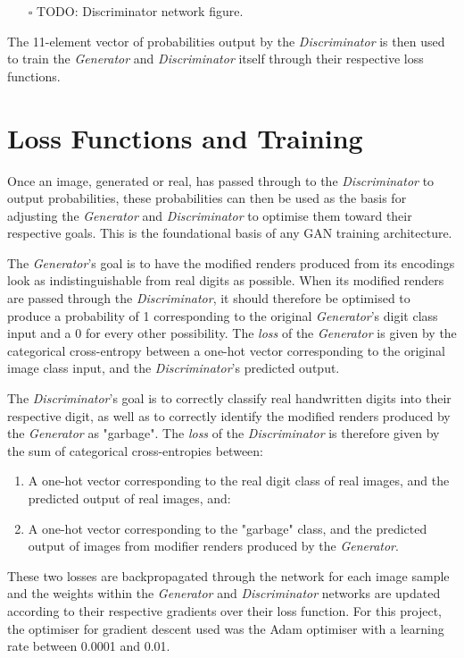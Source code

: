 \documentclass[a4paper,11pt,openany]{book}
\begin{document}
\begin{itemize}
\item[{$\square$}] TODO: Discriminator network figure.
\end{itemize}

The 11-element vector of probabilities output by the \emph{Discriminator} is then used to train the \emph{Generator} and \emph{Discriminator} itself through their respective loss functions.

\section*{Loss Functions and Training}
\label{sec:org99a8998}

Once an image, generated or real, has passed through to the \emph{Discriminator} to output probabilities, these probabilities can then be used as the basis for adjusting the \emph{Generator} and \emph{Discriminator} to optimise them toward their respective goals.
This is the foundational basis of any GAN training architecture.

The \emph{Generator}'s goal is to have the modified renders produced from its encodings look as indistinguishable from real digits as possible.
When its modified renders are passed through the \emph{Discriminator}, it should therefore be optimised to produce a probability of 1 corresponding to the original \emph{Generator}'s digit class input and a 0 for every other possibility.
The \emph{loss} of the \emph{Generator} is given by the categorical cross-entropy between a one-hot vector corresponding to the original image class input, and the \emph{Discriminator}'s predicted output.

The \emph{Discriminator}'s goal is to correctly classify real handwritten digits into their respective digit, as well as to correctly identify the modified renders produced by the \emph{Generator} as "garbage".
The \emph{loss} of the \emph{Discriminator} is therefore given by the sum of categorical cross-entropies between:
\begin{enumerate}
\item A one-hot vector corresponding to the real digit class of real images, and the predicted output of real images, and:
\item A one-hot vector corresponding to the "garbage" class, and the predicted output of images from modifier renders produced by the \emph{Generator}.
\end{enumerate}

These two losses are backpropagated through the network for each image sample and the weights within the \emph{Generator} and \emph{Discriminator} networks are updated according to their respective gradients over their loss function.
For this project, the optimiser for gradient descent used was the Adam optimiser with a learning rate between 0.0001 and 0.01.
\end{document}
